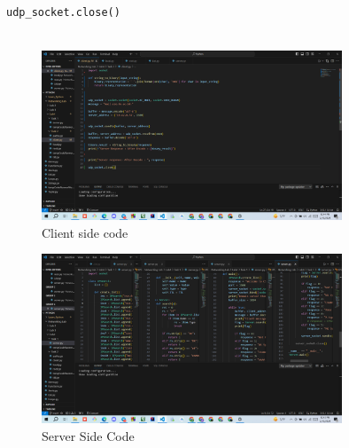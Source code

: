 \documentclass[11pt]{article}
\begin{document}
\begin{itemize}
\begin{verbatim}
udp_socket.close()
    
\end{verbatim}
    \begin{figure}[H]
        \centering
        \includegraphics[width=0.8\textwidth]{Screenshot (163).png}
        \caption{Client side code}
        \label{fig:1}
    \end{figure}
    
    \begin{figure}[H]
        \centering
        \includegraphics[width=0.8\textwidth]{Screenshot (161).png}
        \caption{Server Side Code}
        \label{fig:2}
    \end{figure}
    
    

\end{itemize}

 
\end{document}
